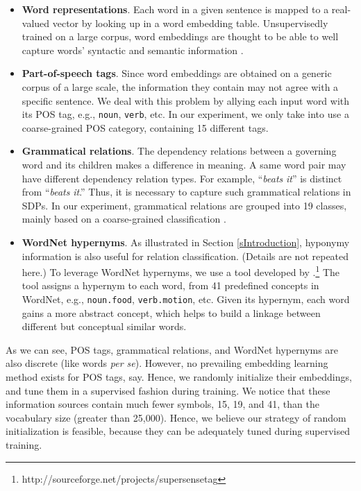 \documentclass[11pt,a4paper]{article}
\begin{document}
\begin{itemize}
\item \textbf{Word representations}. Each word in a given sentence is mapped to a real-valued vector by looking up 
in a word embedding table. Unsupervisedly trained on a large corpus, word embeddings are thought to be able to well capture words' syntactic and semantic information \cite{2013Mikolov}.
\item \textbf{Part-of-speech tags}. Since word embeddings are obtained on
a generic corpus of a large scale, the information they contain may not agree with a specific sentence. We deal with this problem by allying each input word with its POS tag,
 e.g., \verb|noun|, \verb|verb|, etc. In our experiment, we only take into use a coarse-grained POS category, containing 15 different tags.

\item \textbf{Grammatical relations}.
The dependency relations between a governing word and its children
makes a difference in meaning. 
A same word pair may have different dependency relation types.
For example,
``\textit{beats}  \textit{it}''
 is distinct from
``\textit{beats}  \textit{it}.''
Thus, it is necessary to capture such grammatical relations in SDPs.
In our experiment, grammatical relations are grouped into 19 classes, mainly based on a coarse-grained 
classification \cite{TypeDep}.
\item \textbf{WordNet hypernyms}. As illustrated in Section \ref{sIntroduction},
hyponymy information is also useful for relation classification.
(Details are not repeated here.)
To leverage WordNet hypernyms,
we use a tool developed by
.\footnote{http://sourceforge.net/projects/supersensetag}
The tool assigns a hypernym to each word, from 41 predefined concepts in WordNet,
e.g., \verb|noun.food|, \verb|verb.motion|, etc.
Given its hypernym, each word gains a more abstract concept, which helps to build a linkage between different but conceptual similar words.
\end{itemize}

As we can see, POS tags, grammatical relations, and WordNet hypernyms
are also discrete (like words \textit{per se}).
However, no prevailing embedding learning method exists
for POS tags, say.
Hence, we randomly initialize their embeddings, and tune them in a supervised fashion
during training. We notice that these information sources contain much fewer
symbols, 15, 19, and 41, than the vocabulary size (greater than 25,000). Hence, we believe
our strategy of random initialization is feasible, because they can be
adequately tuned during supervised training.
\end{document}
